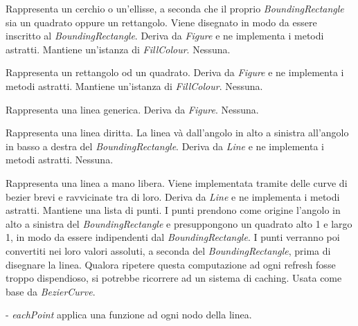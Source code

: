 Rappresenta un cerchio o un'ellisse, a seconda che il proprio \textit{BoundingRectangle} sia un quadrato oppure un rettangolo. Viene disegnato in modo da essere inscritto al \textit{BoundingRectangle}.
Deriva da \textit{Figure} e ne implementa i metodi astratti. Mantiene un'istanza di \textit{FillColour}.
Nessuna.

Rappresenta un rettangolo od un quadrato.
Deriva da \textit{Figure} e ne implementa i metodi astratti. Mantiene un'istanza di \textit{FillColour}.
Nessuna.

Rappresenta una linea generica.
Deriva da \textit{Figure}.
Nessuna.

Rappresenta una linea diritta. La linea v\`a dall'angolo in alto a sinistra all'angolo in basso a destra del \textit{BoundingRectangle}.
Deriva da \textit{Line} e ne implementa i metodi astratti.
Nessuna.

Rappresenta una linea a mano libera. Viene implementata tramite delle curve di bezier brevi e ravvicinate tra di loro.
Deriva da \textit{Line} e ne implementa i metodi astratti. Mantiene una lista di punti. I punti prendono come origine l'angolo in alto a sinistra del \textit{BoundingRectangle} e presuppongono un quadrato alto 1 e largo 1, in modo da essere indipendenti dal \textit{BoundingRectangle}. I punti verranno poi convertiti nei loro valori assoluti, a seconda del \textit{BoundingRectangle}, prima di disegnare la linea. Qualora ripetere questa computazione ad ogni refresh fosse troppo dispendioso, si potrebbe ricorrere ad un sistema di caching.
Usata come base da \textit{BezierCurve}.
\begin{elencopuntato}[\normindent]
\item[-] \textit{eachPoint} applica una funzione ad ogni nodo della linea.
\end{elencopuntato}

